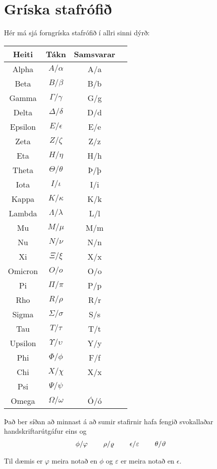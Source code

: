 \chapter*{Gríska stafrófið}

Hér má sjá forngríska stafrófið í allri sinni dýrð:

\begin{center}
	\begin{tabular}{| c | c | c |c|}
		\hline
	Heiti & Tákn & Samsvarar \\ 
	\hline \hline
	Alpha & $A/\alpha$ & A/a \\
	Beta & $B/\beta$ & B/b \\
	Gamma & $\Gamma/\gamma$ & G/g \\
	Delta & $\Delta/\delta$ & D/d \\
	Epsilon & $E/\epsilon$ & E/e \\
	Zeta & $Z/\zeta$ & Z/z \\
	Eta & $H/\eta$ & H/h \\
    Theta & $\Theta/\theta$ & Þ/þ \\
    Iota & $I/\iota$ & I/i \\
    Kappa & $K/\kappa$ & K/k \\
    Lambda & $\Lambda/\lambda$ & L/l \\
    Mu & $M/\mu$ & M/m  \\
    Nu & $N/\nu$ & N/n  \\
    Xi & $\Xi/\xi$ & X/x  \\
    Omicron & $O/o$ & O/o \\
    Pi & $\Pi/\pi$ & P/p \\
    Rho & $R/\rho$ & R/r \\
    Sigma & $\Sigma / \sigma$ & S/s \\
    Tau & $T/\tau$ & T/t \\
    Upsilon & $\Upsilon /  \upsilon$ & Y/y \\
    Phi & $\Phi /  \phi$ & F/f \\
    Chi & $X /  \chi$ & X/x \\
    Psi & $\Psi /  \psi$ &  \\
    Omega & $\Omega /  \omega$ & Ó/ó \\
	\hline
\end{tabular}
\end{center}

Það ber síðan að minnast á að sumir stafirnir hafa fengið svokallaðar handskriftarútgáfur eins og
\begin{align*}
    \phi/\varphi \hspace{0.8cm} \rho/\varrho \hspace{0.8cm}
    \epsilon/\varepsilon \hspace{0.8cm} 
    \theta/\vartheta \hspace{0.8cm} 
\end{align*}

 Til dæmis er $\varphi$ meira notað en $\phi$ og $\varepsilon$ er meira notað en $\epsilon$.
